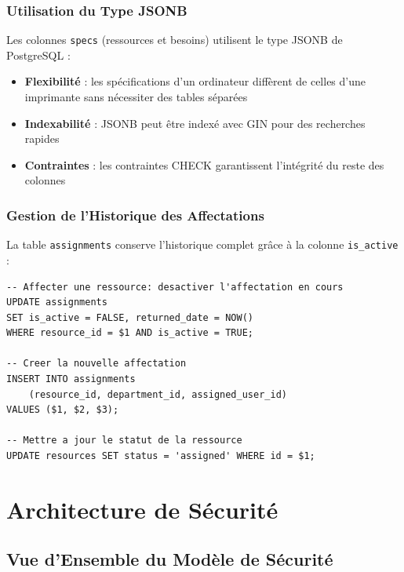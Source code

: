 \documentclass[12pt,a4paper]{report}
\begin{document}
\subsection{Utilisation du Type JSONB}

Les colonnes \texttt{specs} (ressources et besoins) utilisent le type JSONB de PostgreSQL :
\begin{itemize}[leftmargin=1.5cm]
    \item \textbf{Flexibilité} : les spécifications d'un ordinateur diffèrent de celles d'une imprimante sans nécessiter des tables séparées
    \item \textbf{Indexabilité} : JSONB peut être indexé avec GIN pour des recherches rapides
    \item \textbf{Contraintes} : les contraintes CHECK garantissent l'intégrité du reste des colonnes
\end{itemize}

\subsection{Gestion de l'Historique des Affectations}

La table \texttt{assignments} conserve l'historique complet grâce à la colonne \texttt{is\_active} :

\begin{lstlisting}[style=sql, caption={Requête — Affectation active d'une ressource}]
-- Affecter une ressource: desactiver l'affectation en cours
UPDATE assignments
SET is_active = FALSE, returned_date = NOW()
WHERE resource_id = $1 AND is_active = TRUE;

-- Creer la nouvelle affectation
INSERT INTO assignments
    (resource_id, department_id, assigned_user_id)
VALUES ($1, $2, $3);

-- Mettre a jour le statut de la ressource
UPDATE resources SET status = 'assigned' WHERE id = $1;
\end{lstlisting}

\chapter{Architecture de Sécurité}

\section{Vue d'Ensemble du Modèle de Sécurité}
\end{document}
